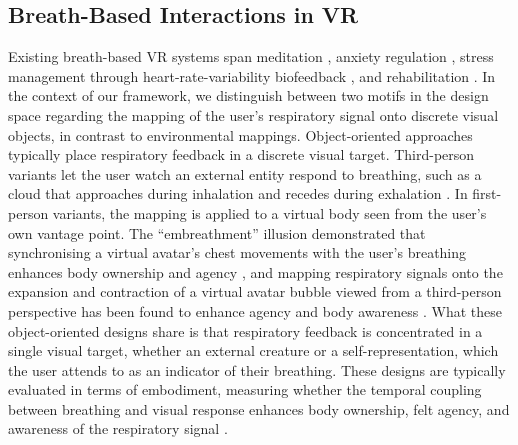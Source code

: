 \subsection{Breath-Based Interactions in VR}
Existing breath-based VR systems span meditation \citep{prpa2020articulating, Shamekhi2018}, anxiety regulation \citep{Bossenbroek2020}, stress management through heart-rate-variability biofeedback \citep{blum2019heart, rockstroh2019virtual}, and rehabilitation \citep{Shi2023, Alhammad2024}. In the context of our framework, we distinguish between two motifs in the design space regarding the mapping of the user's respiratory signal onto discrete visual objects, in contrast to environmental mappings. Object-oriented approaches typically place respiratory feedback in a discrete visual target. Third-person variants let the user watch an external entity respond to breathing, such as a cloud that approaches during inhalation and recedes during exhalation \citep{Tinga2019}. In first-person variants, the mapping is applied to a virtual body seen from the user's own vantage point. The ``embreathment'' illusion demonstrated that synchronising a virtual avatar's chest movements with the user's breathing enhances body ownership and agency \citep{MontiEtAl2020}, and mapping respiratory signals onto the expansion and contraction of a virtual avatar bubble viewed from a third-person perspective has been found to enhance agency and body awareness \citep{Wald2023}. What these object-oriented designs share is that respiratory feedback is concentrated in a single visual target, whether an external creature or a self-representation, which the user attends to as an indicator of their breathing. These designs are typically evaluated in terms of embodiment, measuring whether the temporal coupling between breathing and visual response enhances body ownership, felt agency, and awareness of the respiratory signal \citep{MontiEtAl2020, Wald2023}.

